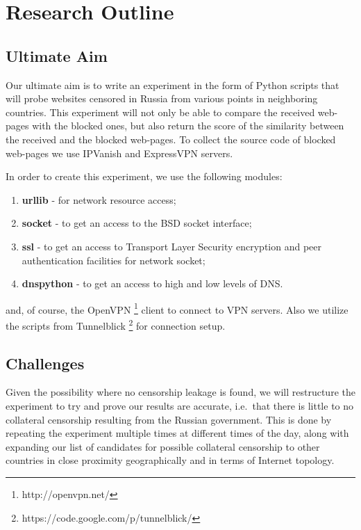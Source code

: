 \documentclass[conference]{IEEEtran}
\begin{document}
\section{Research Outline}
\subsection{Ultimate Aim}
Our ultimate aim is to write an experiment in the form of Python scripts that will probe websites censored in Russia from various points in neighboring countries. 
This experiment will not only be able to compare the received web-pages with the blocked ones, but also return the score of the similarity between the received and the blocked web-pages. 
To collect the source code of blocked web-pages we use IPVanish and ExpressVPN servers.

In order to create this experiment, we use the following modules:
\begin{enumerate}
    \item \textbf{urllib} - for network resource access;
    \item \textbf{socket} - to get an access to the BSD socket interface;
    \item \textbf{ssl} - to get an access to Transport Layer Security encryption and peer authentication facilities for network socket;
    \item \textbf{dnspython} - to get an access to high and low levels of DNS. 
\end{enumerate}
and, of course, the OpenVPN \footnote{http://openvpn.net/} client to connect to VPN servers. Also we utilize the scripts from Tunnelblick \footnote{https://code.google.com/p/tunnelblick/} for connection setup.

\subsection{Challenges}
Given the possibility where no censorship leakage is found, we will restructure the experiment to try and prove our results are accurate, i.e.\  that there is little to no collateral censorship resulting from the Russian government. 
This is done by repeating the experiment multiple times at different times of the day, along with expanding our list of candidates for possible collateral censorship to other countries in close proximity geographically and in terms of Internet topology. 
\end{document}
